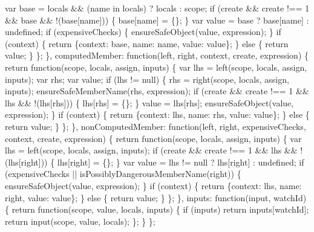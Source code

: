 \begin{DoxyCodeInclude}
{{{{      var base = locals && (name in locals) ? locals : scope;
      \textcolor{keywordflow}{if} (create && create !== 1 && base && !(base[name])) \{
        base[name] = \{\};
      \}
      var value = base ? base[name] : undefined;
      \textcolor{keywordflow}{if} (expensiveChecks) \{
        ensureSafeObject(value, expression);
      \}
      \textcolor{keywordflow}{if} (context) \{
        \textcolor{keywordflow}{return} \{context: base, name: name, value: value\};
      \} \textcolor{keywordflow}{else} \{
        \textcolor{keywordflow}{return} value;
      \}
    \};
  \},
  computedMember: \textcolor{keyword}{function}(left, right, context, create, expression) \{
    \textcolor{keywordflow}{return} \textcolor{keyword}{function}(scope, locals, assign, inputs) \{
      var lhs = left(scope, locals, assign, inputs);
      var rhs;
      var value;
      \textcolor{keywordflow}{if} (lhs != null) \{
        rhs = right(scope, locals, assign, inputs);
        ensureSafeMemberName(rhs, expression);
        \textcolor{keywordflow}{if} (create && create !== 1 && lhs && !(lhs[rhs])) \{
          lhs[rhs] = \{\};
        \}
        value = lhs[rhs];
        ensureSafeObject(value, expression);
      \}
      \textcolor{keywordflow}{if} (context) \{
        \textcolor{keywordflow}{return} \{context: lhs, name: rhs, value: value\};
      \} \textcolor{keywordflow}{else} \{
        \textcolor{keywordflow}{return} value;
      \}
    \};
  \},
  nonComputedMember: \textcolor{keyword}{function}(left, right, expensiveChecks, context, create, expression) \{
    \textcolor{keywordflow}{return} \textcolor{keyword}{function}(scope, locals, assign, inputs) \{
      var lhs = left(scope, locals, assign, inputs);
      \textcolor{keywordflow}{if} (create && create !== 1 && lhs && !(lhs[right])) \{
        lhs[right] = \{\};
      \}
      var value = lhs != null ? lhs[right] : undefined;
      \textcolor{keywordflow}{if} (expensiveChecks || isPossiblyDangerousMemberName(right)) \{
        ensureSafeObject(value, expression);
      \}
      \textcolor{keywordflow}{if} (context) \{
        \textcolor{keywordflow}{return} \{context: lhs, name: right, value: value\};
      \} \textcolor{keywordflow}{else} \{
        \textcolor{keywordflow}{return} value;
      \}
    \};
  \},
  inputs: \textcolor{keyword}{function}(input, watchId) \{
    \textcolor{keywordflow}{return} \textcolor{keyword}{function}(scope, value, locals, inputs) \{
      \textcolor{keywordflow}{if} (inputs) \textcolor{keywordflow}{return} inputs[watchId];
      \textcolor{keywordflow}{return} input(scope, value, locals);
    \};
  \}
\};

}}}}
\end{DoxyCodeInclude}
